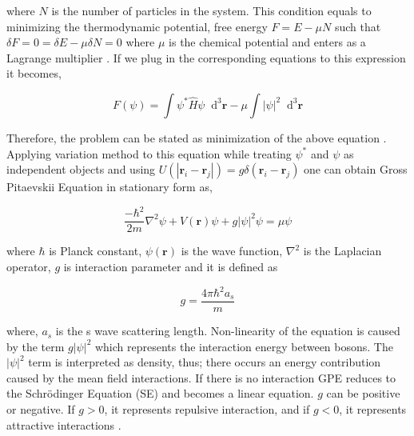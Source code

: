 \documentclass[a4paper,times,hidelinks,12pt]{article}
\newcommand*\dif{\mathop{}\!\mathrm{d}}
\begin{document}
\noindent where $N$ is the number of particles in the system. This condition equals to minimizing the thermodynamic potential, free energy $F = E - \mu N$ such that $\delta F = 0 = \delta E - \mu \delta N = 0$ where $\mu$ is the chemical potential and enters as a Lagrange multiplier \cite{pethick2002bose}. If we plug in the corresponding equations to this expression it becomes,  

\begin{equation}
\label{eq:GPE_derivation_free_energy}
F(\psi) = \int \psi^{*}\hat{H}\psi \dif^3\boldsymbol{r} - \mu \int |\psi|^2 \dif^3\boldsymbol{r}
\end{equation}

\noindent Therefore, the problem can be stated as minimization of the above equation \cite{rogel2013gross}. Applying variation method to this equation while treating $\psi^{*}$
and $\psi$ as independent objects and using $U(|\boldsymbol{r}_i - \boldsymbol{r}_j|) = g\delta(\boldsymbol{r}_i - \boldsymbol{r}_j)$ one can obtain Gross Pitaevskii Equation in stationary form as, 

\begin{equation}
\label{eq:GPE_time_indep}
\frac{-\hbar^2}{2m}\nabla^2\psi + V(\boldsymbol{r})\psi + g|\psi|^2\psi = \mu\psi
\end{equation}

%

\noindent where $\hbar$ is Planck constant, $\psi(\boldsymbol{r})$ is the wave function, $\nabla^2$ is the Laplacian operator, $g$ is interaction parameter and it is defined as 

\begin{equation}
\label{eq:GPE_inter_param}
g=\frac{4\pi\hbar^2a_s}{m}
\end{equation}

\noindent where, $a_s$ is the s wave scattering length. Non-linearity of the equation is caused by the term $g|\psi|^2$ which represents the interaction energy between bosons. The $|\psi|^2$ term is interpreted as density, thus; there occurs an energy contribution caused by the mean field interactions. If there is no interaction GPE reduces to the Schr{\"o}dinger Equation (SE) and becomes a linear equation. $g$ can be positive or negative. If $g > 0$, it represents repulsive interaction, and if $g < 0$, it represents attractive interactions \cite{pitaevskii2016bose}.
\end{document}
